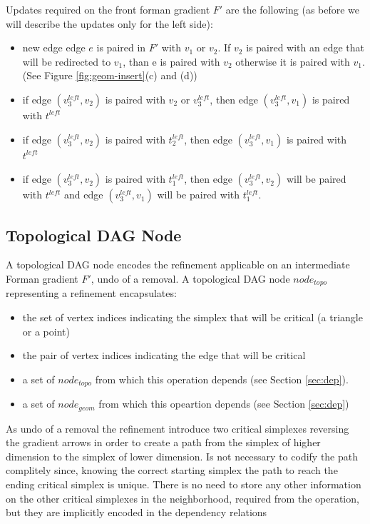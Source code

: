 \documentclass[preprint,5p,times,onecolumn]{article}
\begin{document}
Updates required on the front forman gradient $F'$ are the following (as before we will describe the updates only for the left side):
\begin{itemize}
	\item new edge edge $e$ is paired in $F'$ with $v_1$ or $v_2$. If $v_2$ is paired with an edge that will be redirected to $v_1$, than e is paired with $v_2$ otherwise it is paired with $v_1$. (See Figure \ref{fig:geom-insert}(c) and (d))
	\item if edge $(v_3^{left},v_2)$ is paired with $v_2$ or $v_3^{left}$, then edge $(v_3^{left}, v_1)$ is paired with $t^{left}$
	\item if edge $(v_3^{left},v_2)$ is paired with $t_2^{left}$, then edge $(v_3^{left}, v_1)$ is paired with $t^{left}$
	\item if edge $(v_3^{left},v_2)$ is paired with $t_1^{left}$, then edge $(v_3^{left},v_2)$ will be paired with $t^{left}$ and edge $(v_3^{left},v_1)$ will be paired with $t_1^{left}$.
\end{itemize}



\subsection{Topological DAG Node}

A topological DAG node encodes the refinement applicable on an intermediate Forman gradient $F'$, undo of a removal. A topological DAG node $node_{topo}$ representing a refinement encapsulates:

\begin{itemize}
	\item the set of vertex indices indicating the simplex that will be critical (a triangle or a point)
	\item the pair of vertex indices indicating the edge that will be critical
	\item a set of $node_{topo}$ from which this operation depends (see Section \ref{sec:dep}).
	\item a set of $node_{geom}$ from which this opeartion depends (see Section \ref{sec:dep})
\end{itemize}

As undo of a removal the refinement introduce two critical simplexes reversing the gradient arrows in order to create a path from the simplex of higher dimension to the simplex of lower dimension. Is not necessary to codify the path complitely since, knowing the correct starting simplex the path to reach the ending critical simplex is unique. There is no need to store any other information on the other critical simplexes in the neighborhood, required from the operation, but they are implicitly encoded in the dependency relations 
\end{document}

